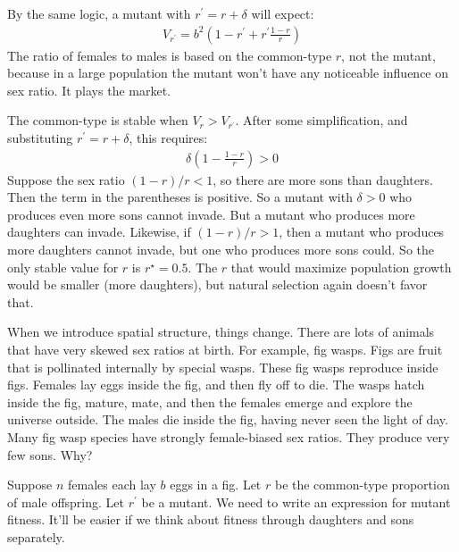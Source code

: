 \documentclass[10pt,reqno]{amsbook}
\numberwithin{equation}{chapter}
\newenvironment{mathbox}[2]
{\begin{table}[#1]
\justify\begin{tcolorbox}[enhanced, oversize]\footnotesize\noindent\textbf{\emph{#2}}}
{\end{tcolorbox}\end{table}}
\begin{document}
By the same logic, a mutant with $r^\prime = r + \delta$ will expect:
\begin{align*}
	V_{r^\prime} = b^2 \left( 1-r^\prime
	+  r^\prime \frac{1-r}{r} \right)
\end{align*}
The ratio of females to males is based on the common-type $r$, not the mutant, because in a large population the mutant won't have any noticeable influence on sex ratio. It plays the market.

The common-type is stable when $V_r > V_{r^\prime}$. After some simplification, and substituting $r^\prime = r + \delta$, this requires:
\begin{align*}
	\delta \left( 1 - \frac{1-r}{r} \right) > 0
\end{align*}
Suppose the sex ratio $(1-r)/r < 1$, so there are more sons than daughters. Then the term in the parentheses is positive. So a mutant with $\delta>0$ who produces even more sons cannot invade. But a mutant who produces more daughters can invade. Likewise, if $(1-r)/r > 1$, then a mutant who produces more daughters cannot invade, but one who produces more sons could. So the only stable value for $r$ is $r^\star=0.5$. The $r$ that would maximize population growth would be smaller (more daughters), but natural selection again doesn't favor that.


When we introduce spatial structure, things change. There are lots of animals that have very skewed sex ratios at birth. For example, fig wasps. Figs are fruit that is pollinated internally by special wasps. These fig wasps reproduce inside figs. Females lay eggs inside the fig, and then fly off to die. The wasps hatch inside the fig, mature, mate, and then the females emerge and explore the universe outside. The males die inside the fig, having never seen the light of day. Many fig wasp species have strongly female-biased sex ratios. They produce very few sons. Why?

Suppose $n$ females each lay $b$ eggs in a fig. Let $r$ be the common-type proportion of male offspring. Let $r^\prime$ be a mutant. We need to write an expression for mutant fitness. It'll be easier if we think about fitness through daughters and sons separately. 
\end{document}
